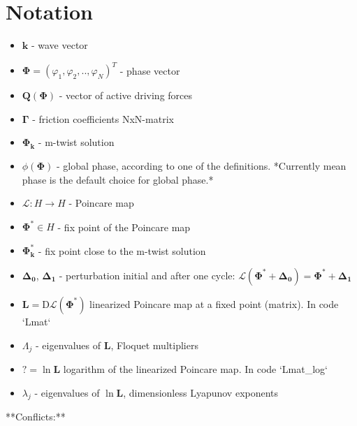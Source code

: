 \documentclass[a4paper,12pt]{article}
\newcommand{\Lmat}{\mathbf{L}}  %
\begin{document}
\setcounter{secnumdepth}{0} %
\setcounter{tocdepth}{2} %

\tableofcontents

\clearpage



\section{Notation}

\begin{itemize}
\item $\mathbf{k}$ - wave vector
\item $\mathbf{\Phi}= (\varphi_1, \varphi_2, .., \varphi_{N})^T $ - phase vector
\item $ \mathbf{Q(\Phi)}$ - vector of active driving forces
\item $ \mathbf{\Gamma}$ - friction coefficients NxN-matrix
\item $\mathbf{\Phi_k}$ - m-twist solution
\item $\phi(\mathbf{\Phi})$ - global phase, according to one of the definitions. *Currently mean phase is the default choice for global phase.*
\item $\mathcal{L}: H \rightarrow H$ - Poincare map
\item $\mathbf{\Phi^*} \in H$ - fix point of the Poincare map
\item $\mathbf{\Phi^{*}_k}$ - fix point close to the m-twist solution
\item $\mathbf{\Delta_0}$, $\mathbf{\Delta_1}$ - perturbation initial and after one cycle: $\mathcal{L}(\mathbf{\Phi^{*}} + \mathbf{\Delta_0}) = \mathbf{\Phi^{*}} + \mathbf{\Delta_1}$
\item $\mathbf{L} = \mathrm{D}\mathcal{L}(\mathbf{\Phi^*})$ linearized Poincare map at a fixed point (matrix). In code `Lmat`
\item $\Lambda_j$ - eigenvalues of $\Lmat$, Floquet multipliers
\item $? = \ln \Lmat $  logarithm of the linearized Poincare map. In code `Lmat\_log`
\item $\lambda_j$ - eigenvalues of $\ln \mathbf{L}$, dimensionless Lyapunov exponents
\end{itemize}

**Conflicts:**
\end{document}
